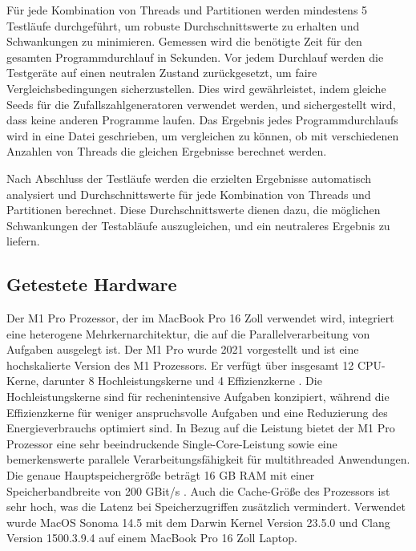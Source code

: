 Für jede Kombination von Threads und Partitionen werden mindestens 5 Testläufe durchgeführt, um robuste Durchschnittswerte zu erhalten und Schwankungen zu minimieren. Gemessen wird die benötigte Zeit für den gesamten Programmdurchlauf in Sekunden. Vor jedem Durchlauf werden die Testgeräte auf einen neutralen Zustand zurückgesetzt, um faire Vergleichsbedingungen sicherzustellen. Dies wird gewährleistet, indem gleiche Seeds für die Zufallszahlgeneratoren verwendet werden, und sichergestellt wird, dass keine anderen Programme laufen.
Das Ergebnis jedes Programmdurchlaufs wird in eine Datei geschrieben, um vergleichen zu können, ob mit verschiedenen Anzahlen von Threads die gleichen Ergebnisse berechnet werden.

Nach Abschluss der Testläufe werden die erzielten Ergebnisse automatisch analysiert und Durchschnittswerte für jede Kombination von Threads und Partitionen berechnet. Diese Durchschnittswerte dienen dazu, die möglichen Schwankungen der Testabläufe auszugleichen, und ein neutraleres Ergebnis zu liefern.

\subsection{Getestete Hardware}

Der M1 Pro Prozessor, der im MacBook Pro 16 Zoll verwendet wird, integriert eine heterogene Mehrkernarchitektur, die auf die Parallelverarbeitung von Aufgaben ausgelegt ist. Der M1 Pro wurde 2021 vorgestellt und ist eine hochskalierte Version des M1 Prozessors. Er verfügt über insgesamt 12 CPU-Kerne, darunter 8 Hochleistungskerne und 4 Effizienzkerne \citep{MacBook_Technische_Daten}. Die Hochleistungskerne sind für rechenintensive Aufgaben konzipiert, während die Effizienzkerne für weniger anspruchsvolle Aufgaben und eine Reduzierung des Energieverbrauchs optimiert sind.
In Bezug auf die Leistung bietet der M1 Pro Prozessor eine sehr beeindruckende Single-Core-Leistung sowie eine bemerkenswerte parallele Verarbeitungsfähigkeit für multithreaded Anwendungen. Die genaue Hauptspeichergröße beträgt 16 GB RAM mit einer Speicherbandbreite von 200 GBit/s \citep{MacBook_Technische_Daten}. Auch die Cache-Größe des Prozessors ist sehr hoch, was die Latenz bei Speicherzugriffen zusätzlich vermindert.
Verwendet wurde MacOS Sonoma 14.5 mit dem Darwin Kernel Version 23.5.0 und Clang Version 1500.3.9.4 auf einem MacBook Pro 16 Zoll Laptop.


